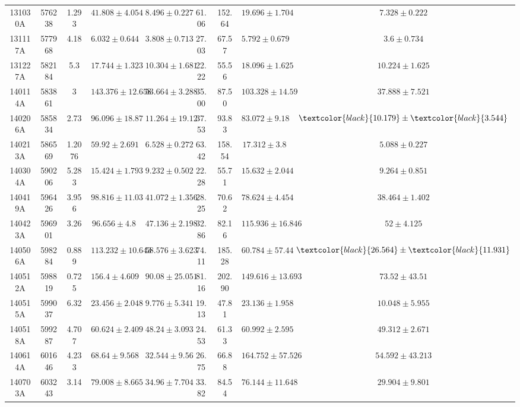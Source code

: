 \documentclass[prd,nofootinbib,preprintnumbers,floatfix]{revtex4}  %
\newcommand{\rthis}[1]{\textcolor{black}{#1}}
\begin{document}
\begin{center}
\begin{longtable*}{|c|c|c|c|c|c|c|c|c|}
131030A	&	576238	&	1.293	&	$	41.808	\pm	4.054	$	&	$	8.496	\pm	0.227	$	&	61.06	&	152.64	&	$	19.696	\pm	1.704	$	&	$	7.328	\pm	0.222	$	\\
131117A	&	577968	&	4.18	&	$	6.032	\pm	0.644	$	&	$	3.808	\pm	0.713	$	&	27.03	&	67.57	&	$	5.792	\pm	0.679	$	&	$	3.6	\pm	0.734	$	\\
131227A	&	582184	&	5.3	&	$	17.744	\pm	1.323	$	&	$	10.304	\pm	1.681	$	&	22.22	&	55.56	&	$	18.096	\pm	1.625	$	&	$	10.224	\pm	1.625	$	\\
140114A	&	583861	&	3	&	$	143.376	\pm	12.658	$	&	$	53.664	\pm	3.288	$	&	35.00	&	87.50	&	$	103.328	\pm	14.59	$	&	$	37.888	\pm	7.521	$	\\
140206A	&	585834	&	2.73	&	$	96.096	\pm	18.87	$	&	$	11.264	\pm	19.12	$	&	37.53	&	93.83	&	$	83.072	\pm	9.18	$	&	$	\rthis{10.179}	\pm	\rthis{3.544}	$	\\
140213A	&	586569	&	1.2076	&	$	59.92	\pm	2.691	$	&	$	6.528	\pm	0.272	$	&	63.42	&	158.54	&	$	17.312	\pm	3.8	$	&	$	5.088	\pm	0.227	$	\\
140304A	&	590206	&	5.283	&	$	15.424	\pm	1.793	$	&	$	9.232	\pm	0.502	$	&	22.28	&	55.71	&	$	15.632	\pm	2.044	$	&	$	9.264	\pm	0.851	$	\\
140419A	&	596426	&	3.956	&	$	98.816	\pm	11.03	$	&	$	41.072	\pm	1.356	$	&	28.25	&	70.62	&	$	78.624	\pm	4.454	$	&	$	38.464	\pm	1.402	$	\\
140423A	&	596901	&	3.26	&	$	96.656	\pm	4.8	$	&	$	47.136	\pm	2.198	$	&	32.86	&	82.16	&	$	115.936	\pm	16.846	$	&	$	52	\pm	4.125	$	\\
140506A	&	598284	&	0.889	&	$	113.232	\pm	10.643	$	&	$	58.576	\pm	3.623	$	&	74.11	&	185.28	&	$	60.784	\pm	57.44	$	&	$	\rthis{26.564}	\pm	\rthis{11.931}	$	\\
140512A	&	598819	&	0.725	&	$	156.4	\pm	4.609	$	&	$	90.08	\pm	25.051	$	&	81.16	&	202.90	&	$	149.616	\pm	13.693	$	&	$	73.52	\pm	43.51	$	\\
140515A	&	599037	&	6.32	&	$	23.456	\pm	2.048	$	&	$	9.776	\pm	5.341	$	&	19.13	&	47.81	&	$	23.136	\pm	1.958	$	&	$	10.048	\pm	5.955	$	\\
140518A	&	599287	&	4.707	&	$	60.624	\pm	2.409	$	&	$	48.24	\pm	3.093	$	&	24.53	&	61.33	&	$	60.992	\pm	2.595	$	&	$	49.312	\pm	2.671	$	\\
140614A	&	601646	&	4.233	&	$	68.64	\pm	9.568	$	&	$	32.544	\pm	9.56	$	&	26.75	&	66.88	&	$	164.752	\pm	57.526	$	&	$	54.592	\pm	43.213	$	\\
140703A	&	603243	&	3.14	&	$	79.008	\pm	8.665	$	&	$	34.96	\pm	7.704	$	&	33.82	&	84.54	&	$	76.144	\pm	11.648	$	&	$	29.904	\pm	9.801	$	\\

\end{longtable*}
\end{center}
\end{document}
